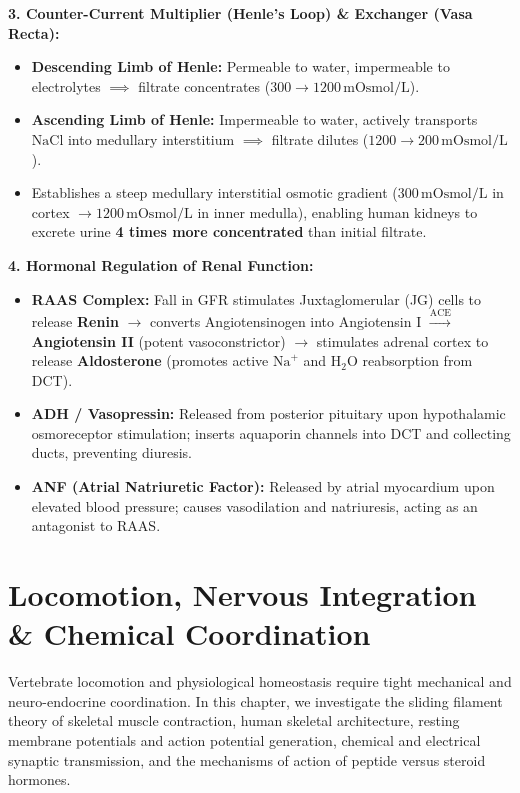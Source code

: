\documentclass[10pt,twoside,openright]{book}
\begin{document}
\begin{conceptbox}
\textbf{3. Counter-Current Multiplier (Henle's Loop) \& Exchanger (Vasa Recta):}
\begin{itemize}
  \item \textbf{Descending Limb of Henle:} Permeable to water, impermeable to electrolytes $\implies$ filtrate concentrates ($300 \to 1200\,\mathrm{mOsmol/L}$).
  \item \textbf{Ascending Limb of Henle:} Impermeable to water, actively transports $\mathrm{NaCl}$ into medullary interstitium $\implies$ filtrate dilutes ($1200 \to 200\,\mathrm{mOsmol/L}$).
  \item Establishes a steep medullary interstitial osmotic gradient ($300\,\mathrm{mOsmol/L}$ in cortex $\to 1200\,\mathrm{mOsmol/L}$ in inner medulla), enabling human kidneys to excrete urine \textbf{4 times more concentrated} than initial filtrate.
\end{itemize}

\textbf{4. Hormonal Regulation of Renal Function:}
\begin{itemize}
  \item \textbf{RAAS Complex:} Fall in GFR stimulates Juxtaglomerular (JG) cells to release \textbf{Renin} $\to$ converts Angiotensinogen into Angiotensin I $\xrightarrow{\text{ACE}}$ \textbf{Angiotensin II} (potent vasoconstrictor) $\to$ stimulates adrenal cortex to release \textbf{Aldosterone} (promotes active $\mathrm{Na}^+$ and $\mathrm{H}_2\mathrm{O}$ reabsorption from DCT).
  \item \textbf{ADH / Vasopressin:} Released from posterior pituitary upon hypothalamic osmoreceptor stimulation; inserts aquaporin channels into DCT and collecting ducts, preventing diuresis.
  \item \textbf{ANF (Atrial Natriuretic Factor):} Released by atrial myocardium upon elevated blood pressure; causes vasodilation and natriuresis, acting as an antagonist to RAAS.
\end{itemize}
\end{conceptbox}

\chapter{Locomotion, Nervous Integration \& Chemical Coordination}

Vertebrate locomotion and physiological homeostasis require tight mechanical and neuro-endocrine coordination. In this chapter, we investigate the sliding filament theory of skeletal muscle contraction, human skeletal architecture, resting membrane potentials and action potential generation, chemical and electrical synaptic transmission, and the mechanisms of action of peptide versus steroid hormones.
\end{document}
